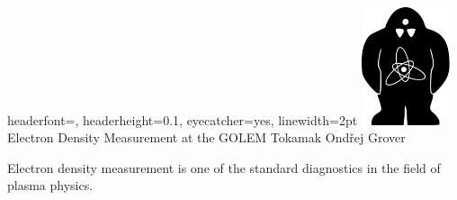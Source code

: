 \documentclass[portrait,final,a0paper]{baposter}
\begin{document}
\begin{poster}
{%
  headerfont=\Large\textsf, %
  headerheight=0.1\textheight,%
  eyecatcher=yes,
  linewidth=2pt
  }
  {\includegraphics[width=7em]{golem.pdf}} %
  {%
  \sc\huge Electron Density Measurement at the GOLEM Tokamak \vspace{ 0.2cm}}
  {Ondřej Grover
}{
}


{
Electron density measurement is one of the standard diagnostics in the field of plasma physics. 

}
\end{poster}
\end{document}
